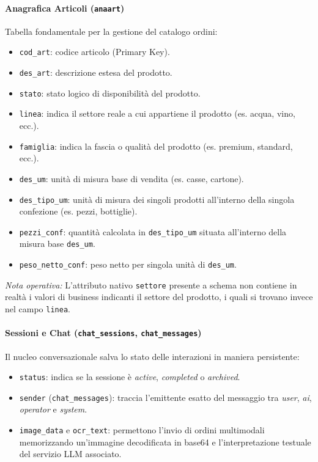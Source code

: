 \documentclass[a4paper, 11pt, oneside]{scrartcl}
\begin{document}
\paragraph{Anagrafica Articoli (\texttt{anaart})}
Tabella fondamentale per la gestione del catalogo ordini:
\begin{itemize}
    \item \texttt{cod\_art}: codice articolo (Primary Key).
    \item \texttt{des\_art}: descrizione estesa del prodotto.
    \item \texttt{stato}: stato logico di disponibilità del prodotto.
    \item \texttt{linea}: indica il settore reale a cui appartiene il prodotto (es. acqua, vino, ecc.).
    \item \texttt{famiglia}: indica la fascia o qualità del prodotto (es. premium, standard, ecc.).
    \item \texttt{des\_um}: unità di misura base di vendita (es. casse, cartone).
    \item \texttt{des\_tipo\_um}: unità di misura dei singoli prodotti all'interno della singola confezione (es. pezzi, bottiglie).
    \item \texttt{pezzi\_conf}: quantità calcolata in \texttt{des\_tipo\_um} situata all'interno della misura base \texttt{des\_um}.
    \item \texttt{peso\_netto\_conf}: peso netto per singola unità di \texttt{des\_um}.
\end{itemize}
\textit{Nota operativa:} L'attributo nativo \texttt{settore} presente a schema non contiene in realtà i valori di business indicanti il settore del prodotto, i quali si trovano invece nel campo \texttt{linea}.

\paragraph{Sessioni e Chat (\texttt{chat\_sessions}, \texttt{chat\_messages})}
Il nucleo conversazionale salva lo stato delle interazioni in maniera persistente:
\begin{itemize}
    \item \texttt{status}: indica se la sessione è \textit{active}, \textit{completed} o \textit{archived}.
    \item \texttt{sender} (\texttt{chat\_messages}): traccia l'emittente esatto del messaggio tra \textit{user}, \textit{ai}, \textit{operator} e \textit{system}.
    \item \texttt{image\_data} e \texttt{ocr\_text}: permettono l'invio di ordini multimodali memorizzando un'immagine decodificata in base64 e l'interpretazione testuale del servizio LLM associato.
\end{itemize}
\end{document}
